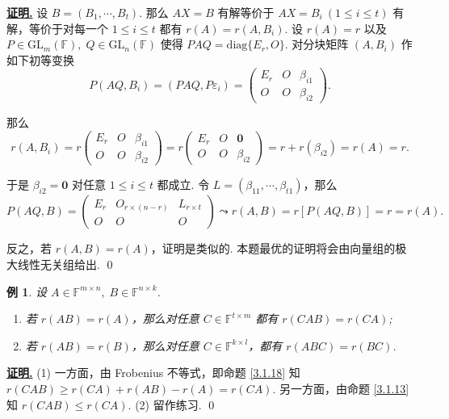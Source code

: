 \documentclass[10pt,openany]{article}
\theoremstyle{thmstyle} %
\theoremstyle{defstyle} %
\theoremstyle{prostyle} %
\theoremstyle{exastyle}
\newtheorem{example}[theorem]{例}
\theoremstyle{remstyle}
\renewenvironment{proof}[1][证明]{\par\underline{\textbf{#1.}} \;\fangsong}{\qed\par}
\newcommand{\F}{\mathbb{F}}
\newcommand{\gfn}{\text{GL}_n(\mathbb{F})}
\newcommand{\gfm}{\text{GL}_m(\mathbb{F})}
\newcommand{\mn}{^{m \times n}}
\newcommand{\diag}{\mathrm{diag}}
\begin{document}
\begin{proof}
   设 \( B=(B_1,\cdots,B_t) \). 那么 \( AX=B \) 有解等价于 \( AX=B_i \ (1 \leq i \leq t) \) 有解，等价于对每一个 \( 1 \leq i \leq t \) 都有 \( r(A)=r(A,B_i) \). 设 \( r(A)=r \) 以及 \( P \in \gfm, \; Q \in \gfn  \) 使得 \( PAQ=\diag\{E_r,O\} \). 对分块矩阵 \( (A,B_i) \) 作如下初等变换
   	\[ P(AQ,B_i)=(PAQ,P\varepsilon_i)= \begin{pmatrix}
   		E_r & O & \beta_{i1} \\
   		O & O & \beta_{i2}
   	\end{pmatrix}. \] 
   
   那么
   \[ r(A,B_i)=r\begin{pmatrix}
   	E_r & O & \beta_{i1} \\
   	O & O & \beta_{i2}
   \end{pmatrix}=r\begin{pmatrix}
   	E_r & O & \bm{0} \\
   	O & O & \beta_{i2}
   \end{pmatrix}=r+r(\beta_{i2})=r(A)=r. \]
   
   于是 \( \beta_{i2}=\bm{0} \) 对任意 \( 1 \leq i \leq t \) 都成立. 令 \( L=(\beta_{11},\cdots,\beta_{t1})\)，那么
   \[ P(AQ,B) = \begin{pmatrix}
   	E_r & O_{r \times (n-r)} & L_{r \times t} \\
   	O & O & O
   \end{pmatrix} \leadsto r(A,B)=r[P(AQ,B)]=r=r(A). \]
   
   反之，若 \( r(A,B)=r(A) \)，证明是类似的. 本题最优的证明将会由向量组的极大线性无关组给出.
\end{proof}


\begin{example} \label{3.1.29}
	设 \(  A \in \F\mn, \; B \in \F^{n \times k} \). 
	\begin{enumerate}[(1)]
		\item 若 \( r(AB)=r(A) \)，那么对任意 \( C \in \F^{t \times m} \) 都有 \( r(CAB)=r(CA) \);
		\item 若 \( r(AB)=r(B) \)，那么对任意 \( C \in \F^{k \times l} \)，都有 \( r(ABC)=r(BC) \).
	\end{enumerate}
\end{example}

\begin{proof}
	(1) 一方面，由 Frobenius 不等式，即命题 \ref{3.1.18} 知 \( r(CAB) \geq r(CA)+r(AB)-r(A)=r(CA) \). 另一方面，由命题 \ref{3.1.13} 知 \( r(CAB) \leq r(CA) \). (2) 留作练习.
\end{proof}
\end{document}
